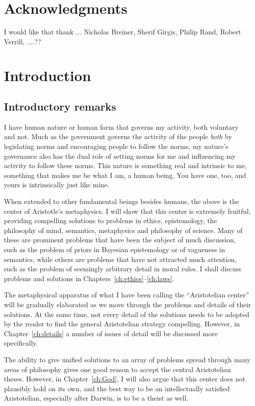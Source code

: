 \def\mychapter{I}

\chapter*{Acknowledgments}
I would like that thank ... Nicholas Breiner, Sherif Girgis, Philip Rand, Robert Verrill, ....??

\chapter{Introduction}\label{ch:intro}
\section{Introductory remarks}
I have human nature or human form that governs my activity, both voluntary and not.
Much as the government governs the activity of the people \textit{both} by legislating norms and encouraging
people to follow the norms, my nature's governance also has the dual role of setting norms for me and influencing my
activity to follow these norms. This nature is something real and intrinsic to me, something that makes me be what I am, 
a human being. You have one, too, and yours is intrinsically just like mine.

When extended to other fundamental beings besides humans, the above is the center of Aristotle's metaphysics.
I will show that this center is extremely fruitful, providing compelling solutions to problems in ethics,
epistemology, the philosophy of mind, semantics, metaphysics and philosophy of science. Many of these are prominent problems that have been
the subject of much discussion, such as the problem of priors in Bayesian epistemology or of vagueness in semantics, while others 
are problems
that have not attracted much attention, such as the problem of seemingly arbitrary detail in moral rules. 
I shall discuss problems and solutions in Chapters~\ref{ch:ethics}--\ref{ch:laws}.

The metaphysical apparatus of what I have been calling the ``Aristotelian center'' will be gradually elaborated
as we move through the problems and details of their solutions. At the same time, not every detail of the solutions needs to be
adopted by the reader to find the general Aristotelian strategy compelling. However, in Chapter~\ref{ch:details} a number of 
issues of detail will be discussed more specifically.

The ability to give unified solutions to an array of problems spread through many areas of philosophy gives one
good reason to accept the central Aristotelian theses. However, in Chapter~\ref{ch:God}, I will also argue that this center does
not plausibly hold on its own, and the best way to be an intellectually satisfied Aristotelian, especially after Darwin, is to be a theist 
as well. 

